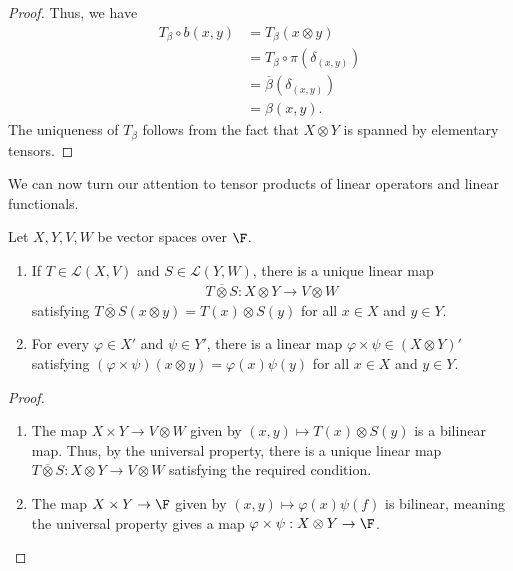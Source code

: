 \documentclass[10pt]{mypackage}
\begin{document}
\begin{proof}
  Thus, we have
  \begin{align*}
    T_{\beta}\circ b\left(x,y\right) &= T_{\beta}\left(x\otimes y\right)\\
                                     &= T_{\beta}\circ \pi\left(\delta_{\left(x,y\right)}\right)\\
                                     &= \overline{\beta}\left(\delta_{\left(x,y\right)}\right)\\
                                     &= \beta\left(x,y\right).
  \end{align*}
  The uniqueness of $T_{\beta}$ follows from the fact that $X\otimes Y$ is spanned by elementary tensors.
\end{proof}
We can now turn our attention to tensor products of linear operators and linear functionals.
\begin{proposition}
  Let $X,Y,V,W$ be vector spaces over $\F$.
  \begin{enumerate}[(1)]
    \item If $T\in \mathcal{L}\left(X,V\right)$ and $S\in \mathcal{L}\left(Y,W\right)$, there is a unique linear map
      \begin{align*}
        T\overline{\otimes}S : X\otimes Y \rightarrow V\otimes W
      \end{align*}
      satisfying $T\overline{\otimes}S\left(x\otimes y\right) = T\left(x\right)\otimes S\left(y\right)$ for all $x\in X$ and $y\in Y$.
    \item For every $\varphi\in X'$ and $\psi\in Y'$, there is a linear map $\varphi\times \psi\in \left(X\otimes Y\right)'$ satisfying $\left(\varphi\times \psi\right)\left(x\otimes y\right) = \varphi(x)\psi(y)$ for all $x\in X$ and $y\in Y$.
  \end{enumerate}
\end{proposition}
\begin{proof}\hfill
  \begin{enumerate}[(1)]
    \item The map $X\times Y\rightarrow V\otimes W$ given by $\left(x,y\right)\mapsto T(x)\otimes S(y)$ is a bilinear map. Thus, by the universal property, there is a unique linear map $T\overline{\otimes}S: X\otimes Y\rightarrow V\otimes W$ satisfying the required condition.
    \item The map $X\times Y\rightarrow \F$ given by $\left(x,y\right)\mapsto \varphi(x)\psi(f)$ is bilinear, meaning the universal property gives a map $\varphi\times\psi: X\otimes Y\rightarrow \F$.
  \end{enumerate}
\end{proof}
\end{document}
